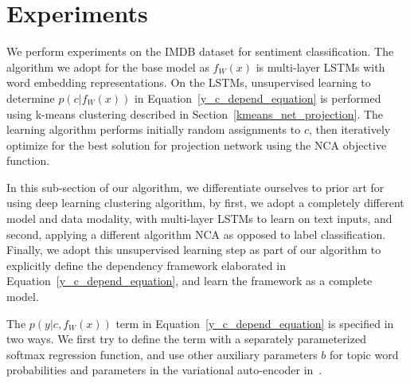 \documentclass{article}
\begin{document}
\section{Experiments} 

We perform experiments on the IMDB dataset for sentiment classification. The algorithm we adopt for the base model as $f_W(x)$ is multi-layer LSTMs with word embedding representations. On the LSTMs, unsupervised learning to determine $p(c|f_W(x))$ in Equation~\ref{y_c_depend_equation} is performed using k-means clustering described in Section~\ref{kmeans_net_projection}. The learning algorithm performs initially random assignments to $c$, then iteratively optimize for the best solution for projection network using the NCA objective function. 

In this sub-section of our algorithm, we differentiate ourselves to prior art for using deep learning clustering algorithm, by first, we adopt a completely different model and data modality, with multi-layer LSTMs to learn on text inputs, and second, applying a different algorithm NCA as opposed to label classification. Finally, we adopt this unsupervised learning step as part of our algorithm to explicitly define the dependency framework elaborated in Equation~\ref{y_c_depend_equation}, and learn the framework as a complete model. 

The $p(y | c, f_W(x))$ term in Equation~\ref{y_c_depend_equation} is specified in two ways. We first try to define the term with a separately parameterized softmax regression function, and use other auxiliary parameters $b$ for topic word probabilities and parameters in the variational auto-encoder in~\cite{topicrnnn}. 

 
 
\end{document}
